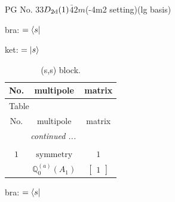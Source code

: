 \documentclass[fleqn,8pt,landscape]{jsarticle}
\begin{document}
\setcounter{MaxMatrixCols}{32}

\renewcommand{\tablename}{Table~}
\renewcommand{\figurename}{Figure~}
\begin{center}
\LARGE
PG No. 33\quad$D_{\rm 2d}(1)$\quad$\bar{4}2m$\quad(-4m2 setting)\quad[ tetragonal ] (lg basis)
\end{center}
bra: $=\bra{s}$

\noindent
ket: $=\ket{s}$
\renewcommand{\arraystretch}{1.6}
\begin{longtable}{ccc}
\caption{(s,s) block.}
 \\
 \hline \hline
No. & multipole & matrix \\ \hline \endfirsthead

\multicolumn{2}{l}{\tablename\ \thetable{}} \\
 \hline \hline
No. & multipole & matrix \\ \hline \endhead

 \hline \hline
\multicolumn{2}{r}{\footnotesize\it continued ...} \\ \endfoot

 \hline \hline
\multicolumn{2}{r}{} \\ \endlastfoot

$ 1 $ & $ \text{symmetry} $ & $ 1 $ \\
$  $ & $ \mathbb{Q}_{0}^{(a)}(A_{1}) $ & $ \begin{bmatrix} 1 \end{bmatrix} $ \\ \hline
\end{longtable}
bra: $=\bra{s}$
\end{document}
